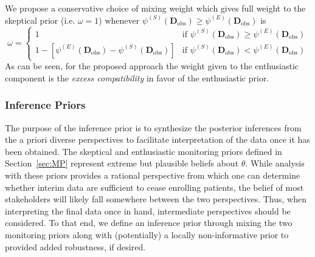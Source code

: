 \documentclass[useAMS,usenatbib,referee]{biom}
\begin{document}
We propose a conservative choice of mixing weight which gives full weight to the skeptical prior (i.e. $\omega=1$) whenever $\psi^{(S)}(\mathbf{D}_{\text{obs}})\geq \psi^{(E)}(\mathbf{D}_{\text{obs}})$ is
\begin{equation}\label{eq:adaptive_prior}
\omega=\begin{cases} 
      1 & \text{if } \psi^{(S)}(\mathbf{D}_{\text{obs}})\geq \psi^{(E)}(\mathbf{D}_{\text{obs}}) \\
      1-\left[ \psi^{(E)}(\mathbf{D}_{\text{obs}})-\psi^{(S)}(\mathbf{D}_{\text{obs}}) \right] &\text{if } \psi^{(S)}(\mathbf{D}_{\text{obs}})< \psi^{(E)}(\mathbf{D}_{\text{obs}})
   \end{cases}
\end{equation}
%
As can be seen, for the proposed approach the weight given to the enthusiastic component is the \textit{excess compatibility} in favor of the enthusiastic prior.
%




%

%



\subsubsection{Inference Priors}
The purpose of the inference prior is to synthesize the posterior inferences from the a priori diverse perspectives to 
facilitate interpretation of the data once it has been obtained. 
%
The skeptical and enthusiastic monitoring priors defined in Section~\ref{sec:MP} represent extreme but plausible 
beliefs about $\theta$.
%
While analysis with these priors provides a rational perspective from which one can determine whether interim data 
are sufficient to cease enrolling patients, the belief of most stakeholders will likely fall somewhere between the 
two perspectives.
%
Thus, when interpreting the final data once in hand, intermediate perspectives should be considered.
%
To that end, we define an inference prior through mixing the two monitoring priors along with (potentially) a locally 
non-informative prior to provided added robustness, if desired.
\end{document}
